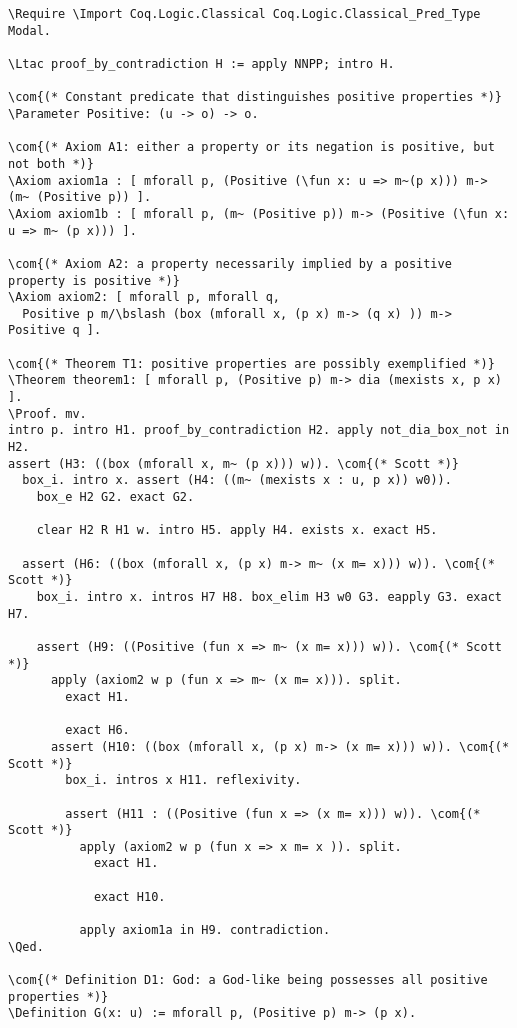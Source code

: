 \documentclass{llncs}
\newcommand{\red}[1]{\textcolor[rgb]{1,0,0}{#1}}
\newcommand{\blue}[1]{\textcolor[rgb]{0,0,1}{#1}}
\newcommand{\brown}[1]{\textcolor[rgb]{0.8,0.6,0.4}{#1}}
\newcommand{\Parameter}{\red{Parameter}}
\newcommand{\Ltac}{\red{Ltac}}
\newcommand{\Axiom}{\red{Axiom}}
\newcommand{\Theorem}{\red{Theorem}}
\newcommand{\Definition}{\red{Definition}}
\newcommand{\Require}{\blue{Require}}
\newcommand{\Import}{\blue{Import}}
\newcommand{\fun}{\blue{fun}}
\newcommand{\Proof}{\blue{Proof}}
\newcommand{\Qed}{\blue{Qed}}
\newcommand{\com}[1]{\brown{#1}}
\newcommand{\bslash}{\symbol{92}}
\begin{document}
\begin{Verbatim}[commandchars=\\\{\},fontsize=\verbsize]
\Require \Import Coq.Logic.Classical Coq.Logic.Classical_Pred_Type Modal.

\Ltac proof_by_contradiction H := apply NNPP; intro H.

\com{(* Constant predicate that distinguishes positive properties *)}
\Parameter Positive: (u -> o) -> o.

\com{(* Axiom A1: either a property or its negation is positive, but not both *)}
\Axiom axiom1a : [ mforall p, (Positive (\fun x: u => m~(p x))) m-> (m~ (Positive p)) ].
\Axiom axiom1b : [ mforall p, (m~ (Positive p)) m-> (Positive (\fun x: u => m~ (p x))) ].

\com{(* Axiom A2: a property necessarily implied by a positive property is positive *)}
\Axiom axiom2: [ mforall p, mforall q, 
  Positive p m/\bslash (box (mforall x, (p x) m-> (q x) )) m-> Positive q ].

\com{(* Theorem T1: positive properties are possibly exemplified *)}
\Theorem theorem1: [ mforall p, (Positive p) m-> dia (mexists x, p x) ].
\Proof. mv.
intro p. intro H1. proof_by_contradiction H2. apply not_dia_box_not in H2.
assert (H3: ((box (mforall x, m~ (p x))) w)). \com{(* Scott *)}
  box_i. intro x. assert (H4: ((m~ (mexists x : u, p x)) w0)).
    box_e H2 G2. exact G2.

    clear H2 R H1 w. intro H5. apply H4. exists x. exact H5.

  assert (H6: ((box (mforall x, (p x) m-> m~ (x m= x))) w)). \com{(* Scott *)}   
    box_i. intro x. intros H7 H8. box_elim H3 w0 G3. eapply G3. exact H7.

    assert (H9: ((Positive (fun x => m~ (x m= x))) w)). \com{(* Scott *)}
      apply (axiom2 w p (fun x => m~ (x m= x))). split.
        exact H1.

        exact H6.
      assert (H10: ((box (mforall x, (p x) m-> (x m= x))) w)). \com{(* Scott *)}
        box_i. intros x H11. reflexivity.

        assert (H11 : ((Positive (fun x => (x m= x))) w)). \com{(* Scott *)}
          apply (axiom2 w p (fun x => x m= x )). split.
            exact H1.

            exact H10.

          apply axiom1a in H9. contradiction.
\Qed.

\com{(* Definition D1: God: a God-like being possesses all positive properties *)}
\Definition G(x: u) := mforall p, (Positive p) m-> (p x).


\end{Verbatim}
\end{document}
